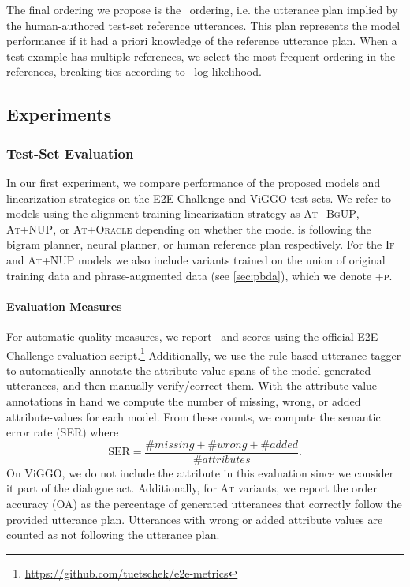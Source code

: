 

The final ordering we propose is the \Oracle~ordering, i.e. the utterance plan
implied by the human-authored test-set reference utterances. This plan
represents the model performance if it had a priori knowledge of the reference
utterance plan. When a test example has multiple references, we select the most
frequent ordering in the references, breaking ties according to
\BgUP~log-likelihood.

\subsection{Experiments}

\subsubsection{Test-Set Evaluation}

In our first experiment, we compare performance of the proposed models and
linearization strategies on the E2E Challenge and ViGGO test sets.  We refer to
models using the alignment training linearization strategy as \textsc{At+BgUP},
\textsc{At+NUP}, or \textsc{At+Oracle} depending on whether the model is
following the bigram planner, neural planner, or human reference plan
respectively.  For the \textsc{If} and \textsc{At+NUP} models we also include
variants trained on the union of original training data and phrase-augmented
data (see \autoref{sec:pbda}), which we denote \textsc{+p}.

\paragraph{Evaluation Measures} For automatic quality measures, we report
\bleu~and \rougel  scores using the official E2E Challenge evaluation
script.\footnote{\url{https://github.com/tuetschek/e2e-metrics}} Additionally,
we use the rule-based utterance tagger to automatically annotate the
attribute-value spans of the model generated utterances, and then manually
verify/correct them. With the attribute-value annotations in hand we compute
the number of missing, wrong, or added attribute-values for each model. From
these counts, we compute the semantic error rate (SER) \citep{dusek2020} where
\[ \textrm{SER} = \frac{\#missing + \#wrong + \#added}{\#attributes}.\]  On
ViGGO, we do not include the  attribute in this evaluation since we
consider it part of the dialogue act.  Additionally, for \textsc{At} variants,
we report the order accuracy (OA) as the percentage of generated utterances
that correctly follow the provided utterance plan. Utterances with wrong or
added attribute values are counted as not following the utterance plan. 

